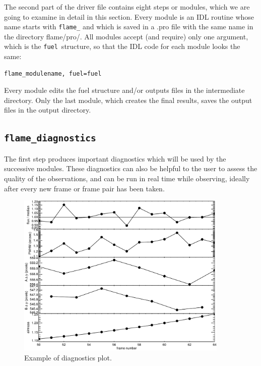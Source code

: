 \documentclass[a4paper, notitlepage]{article}
\newcommand{\fuel}{\texttt{fuel}}
\begin{document}
The second part of the driver file contains eight steps or modules, which we are going to examine in detail in this section. Every module is an IDL routine whose name starts with \texttt{flame\_} and which is saved in a .pro file with the same name in the directory flame/pro/. All modules accept (and require) only one argument, which is the \fuel\ structure, so that the IDL code for each module looks the same:
\begin{lstlisting}
flame_modulename, fuel=fuel
\end{lstlisting}

Every module edits the fuel structure and/or outputs files in the intermediate directory. Only the last module, which creates the final results, saves the output files in the output directory.



\subsection{\texttt{flame\_diagnostics}}

The first step produces important diagnostics which will be used by the successive modules. These diagnostics can also be helpful to the user to assess the quality of the observations, and can be run in real time while observing, ideally after every new frame or frame pair has been taken.

\begin{figure}[htbp]
\centering
\includegraphics[width=0.9\textwidth]{diagnostics}
\caption{Example of diagnostics plot.}
\label{fig:diagnostics}
\end{figure}
\end{document}
